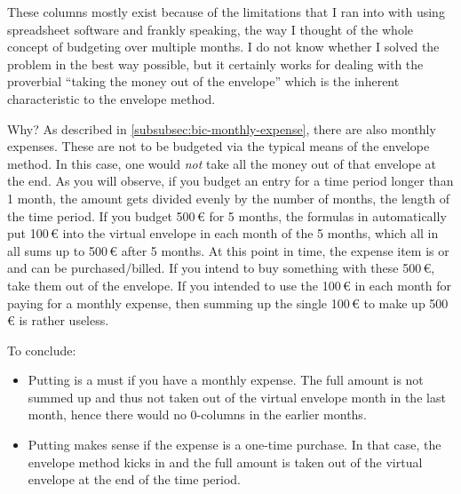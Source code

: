 
These columns mostly exist because of the limitations that I ran into with using spreadsheet software and frankly speaking, the way I thought of the whole concept of budgeting over multiple months.
I do not know whether I solved the problem in the best way possible, but it certainly works for dealing with the proverbial ``taking the money out of the envelope'' which is the inherent characteristic to the envelope method.

Why?
As described in \autoref{subsubsec:bic-monthly-expense}, there are also monthly expenses.
These are not to be budgeted via the typical means of the envelope method.
In this case, one would \emph{not} take all the money out of that envelope at the end.
As you will observe, if you budget an entry for a time period longer than 1 month, the amount gets divided evenly by the number of months, \ie the length of the time period.
If you budget 500\,€ for 5 months, the formulas in \tfn automatically put 100\,€ into the virtual envelope in each month of the 5 months, which all in all sums up to 500\,€ after 5 months.
At this point in time, the expense item is  or  and can be purchased/billed.
If you intend to buy something with these 500\,€, take them out of the envelope.
If you intended to use the 100\,€ in each month for paying for a monthly expense, then summing up the single 100\,€ to make up 500\,€ is rather useless.

To conclude:
\begin{itemize}
	\item Putting  is a must if you have a monthly expense.
	The full amount is not summed up and thus not taken out of the virtual envelope month in the last month, hence there would no 0-columns in the earlier months.
	\item Putting  makes sense if the expense is a one-time purchase.
	In that case, the envelope method kicks in and the full amount is taken out of the virtual envelope at the end of the time period.
\end{itemize}

